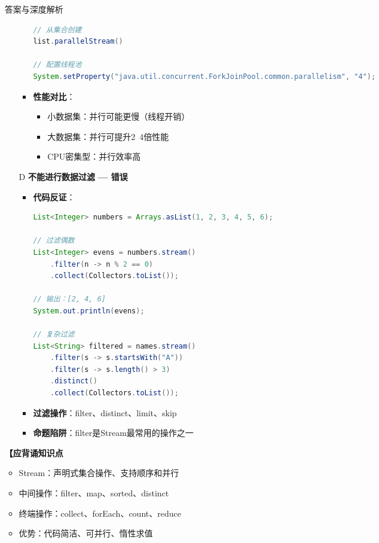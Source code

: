 \documentclass[12pt, a4paper]{ctexart}
\begin{document}
\begin{enumerate}[label=\textbf{\arabic*.}]
\begin{bluebox}{答案与深度解析}
\begin{itemize}[leftmargin=*, nosep, label={}]
\begin{itemize}[label={}, leftmargin=*, nosep]
\begin{lstlisting}[language=Java]
// 从集合创建
list.parallelStream()

// 配置线程池
System.setProperty("java.util.concurrent.ForkJoinPool.common.parallelism", "4");
				      \end{lstlisting}
				            \item \textbf{性能对比}：
				                  \begin{itemize}[label={}, nosep]
					                  \item 小数据集：并行可能更慢（线程开销）
					                  \item 大数据集：并行可提升2~4倍性能
					                  \item CPU密集型：并行效率高
				                  \end{itemize}
			            \end{itemize}

			      \item[D] \textbf{不能进行数据过滤 — 错误}
			            \begin{itemize}[label={}, leftmargin=*, nosep]
				            \item \textbf{代码反证}：
				                  \begin{lstlisting}[language=Java]
List<Integer> numbers = Arrays.asList(1, 2, 3, 4, 5, 6);

// 过滤偶数
List<Integer> evens = numbers.stream()
    .filter(n -> n % 2 == 0)
    .collect(Collectors.toList());

// 输出：[2, 4, 6]
System.out.println(evens);

// 复杂过滤
List<String> filtered = names.stream()
    .filter(s -> s.startsWith("A"))
    .filter(s -> s.length() > 3)
    .distinct()
    .collect(Collectors.toList());
				      \end{lstlisting}
				            \item \textbf{过滤操作}：filter、distinct、limit、skip
				            \item \textbf{命题陷阱}：filter是Stream最常用的操作之一
			            \end{itemize}
		      \end{itemize}

		      \textbf{【应背诵知识点}
		      \begin{itemize}[label={}, nosep]
			      \item Stream：声明式集合操作、支持顺序和并行
			      \item 中间操作：filter、map、sorted、distinct
			      \item 终端操作：collect、forEach、count、reduce
			      \item 优势：代码简洁、可并行、惰性求值
		      \end{itemize}


\end{bluebox}
\end{enumerate}
\end{document}
